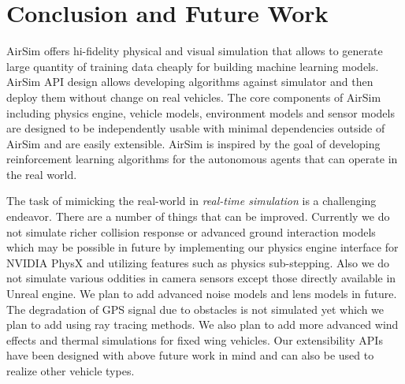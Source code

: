 \documentclass[graybox]{svmult}
\begin{document}
	
	\section{Conclusion and Future Work}
	AirSim offers hi-fidelity physical and visual simulation that allows to generate large quantity of training data cheaply for building machine learning models. AirSim API design allows developing algorithms against simulator and then deploy them without change on real vehicles. The core components of AirSim including physics engine, vehicle models, environment models and sensor models are designed to be independently usable with minimal dependencies outside of AirSim and are easily extensible. AirSim is inspired by the goal of developing reinforcement learning algorithms for the autonomous agents that can operate in the real world.
	
	The task of mimicking the real-world in \emph{real-time simulation} is a challenging endeavor. There are a number of things that can be improved. Currently we do not simulate richer collision response or advanced ground interaction models which may be possible in future by implementing our physics engine interface for NVIDIA PhysX and utilizing features such as physics sub-stepping. Also we do not simulate various oddities in camera sensors except those directly available in Unreal engine. We plan to add advanced noise models and lens models in future. The degradation of GPS signal due to obstacles is not simulated yet which we plan to add using ray tracing methods. We also plan to add more advanced wind effects and thermal simulations for fixed wing vehicles. Our extensibility APIs have been designed with above future work in mind and can also be used to realize other vehicle types.
	
	
	{\footnotesize 
		}
	
\end{document}
